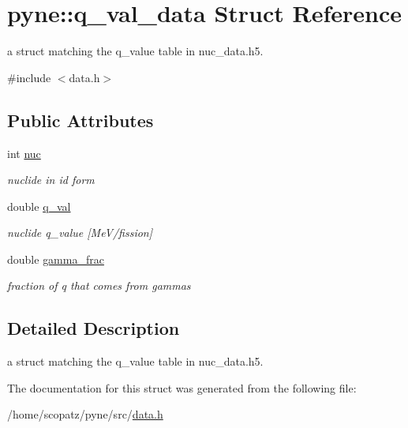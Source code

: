 \hypertarget{structpyne_1_1q__val__data}{\section{pyne\-:\-:q\-\_\-val\-\_\-data Struct Reference}
\label{structpyne_1_1q__val__data}
}


a struct matching the q\-\_\-value table in nuc\-\_\-data.\-h5.  




{\ttfamily \#include $<$data.\-h$>$}

\subsection*{Public Attributes}
\begin{DoxyCompactItemize}
\item 
\hypertarget{structpyne_1_1q__val__data_a39dbf1ad0347f0f68f09c94a9ff9157f}{int \hyperlink{structpyne_1_1q__val__data_a39dbf1ad0347f0f68f09c94a9ff9157f}{nuc}}\label{structpyne_1_1q__val__data_a39dbf1ad0347f0f68f09c94a9ff9157f}

\begin{DoxyCompactList}\small\item\em nuclide in id form \end{DoxyCompactList}\item 
\hypertarget{structpyne_1_1q__val__data_a8016ec428535fddb8cba5005511d4a8a}{double \hyperlink{structpyne_1_1q__val__data_a8016ec428535fddb8cba5005511d4a8a}{q\-\_\-val}}\label{structpyne_1_1q__val__data_a8016ec428535fddb8cba5005511d4a8a}

\begin{DoxyCompactList}\small\item\em nuclide q\-\_\-value \mbox{[}Me\-V/fission\mbox{]} \end{DoxyCompactList}\item 
\hypertarget{structpyne_1_1q__val__data_a5d47c172a924715d567a1b6119e20830}{double \hyperlink{structpyne_1_1q__val__data_a5d47c172a924715d567a1b6119e20830}{gamma\-\_\-frac}}\label{structpyne_1_1q__val__data_a5d47c172a924715d567a1b6119e20830}

\begin{DoxyCompactList}\small\item\em fraction of q that comes from gammas \end{DoxyCompactList}\end{DoxyCompactItemize}


\subsection{Detailed Description}
a struct matching the q\-\_\-value table in nuc\-\_\-data.\-h5. 

The documentation for this struct was generated from the following file\-:\begin{DoxyCompactItemize}
\item 
/home/scopatz/pyne/src/\hyperlink{data_8h}{data.\-h}\end{DoxyCompactItemize}
